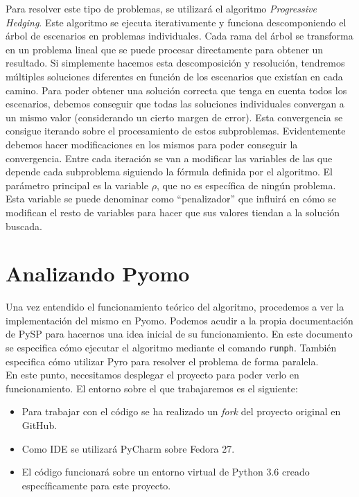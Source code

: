 Para resolver este tipo de problemas, se utilizará el algoritmo \textit{Progressive Hedging}. Este algoritmo se ejecuta iterativamente y funciona descomponiendo el árbol de escenarios en problemas individuales. Cada rama del árbol se transforma en un problema lineal que se puede procesar directamente para obtener un resultado. Si simplemente hacemos esta descomposición y resolución, tendremos múltiples soluciones diferentes en función de los escenarios que existían en cada camino. Para poder obtener una solución correcta que tenga en cuenta todos los escenarios, debemos conseguir que todas las soluciones individuales convergan a un mismo valor (considerando un cierto margen de error). Esta convergencia se consigue iterando sobre el procesamiento de estos subproblemas. Evidentemente debemos hacer modificaciones en los mismos para poder conseguir la convergencia. Entre cada iteración se van a modificar las variables de las que depende cada subproblema siguiendo la fórmula definida por el algoritmo. El parámetro principal es la variable $\rho$, que no es específica de ningún problema. Esta variable se puede denominar como ``penalizador'' que influirá en cómo se modifican el resto de variables para hacer que sus valores tiendan a la solución buscada.

\section{Analizando Pyomo}


Una vez entendido el funcionamiento teórico del algoritmo, procedemos a ver la implementación del mismo en Pyomo. Podemos acudir a la propia documentación de PySP para hacernos una idea inicial de su funcionamiento. En este documento \cite{local_pyspdoc} se especifica cómo ejecutar el algoritmo mediante el comando \texttt{runph}. También especifica cómo utilizar Pyro para resolver el problema de forma paralela.\\

En este punto, necesitamos desplegar el proyecto para poder verlo en funcionamiento. El entorno sobre el que trabajaremos es el siguiente:

\begin{itemize}
    \item Para trabajar con el código se ha realizado un \textit{fork} del proyecto original en GitHub.
    \item Como IDE se utilizará PyCharm sobre Fedora 27.
    \item El código funcionará sobre un entorno virtual de Python 3.6 creado específicamente para este proyecto.
\end{itemize}

